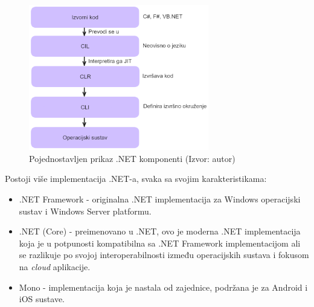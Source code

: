 \documentclass{foi}
\begin{document}
\begin{figure}[H]
    \centering
    \includegraphics[width=0.7\textwidth]{slike/KomponenteNET.png}
    \caption{Pojednostavljen prikaz .NET komponenti (Izvor: autor)}
    \label{fig:netkomponente}
\end{figure}
\begin{flushleft}
Postoji više implementacija .NET-a, svaka sa svojim karakteristikama\cite{NETintro}:
\end{flushleft}
\begin{itemize}
    \item .NET Framework - originalna .NET implementacija za Windows operacijski sustav i Windows Server platformu. 
    \item .NET (Core) - preimenovano u .NET, ovo je moderna .NET implementacija koja je u potpunosti kompatibilna sa .NET Framework implementacijom ali se razlikuje po svojoj interoperabilnosti između operacijskih sustava i fokusom na \textit{cloud} aplikacije.
    \item Mono - implementacija koja je nastala od zajednice, podržana je za Android i iOS sustave.
\end{itemize}
\end{document}

